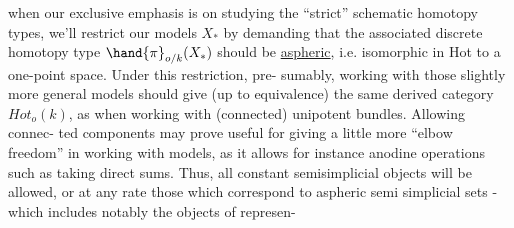 when our exclusive emphasis is on studying the  ``strict'' schematic
homotopy types,  we'll restrict our models $X_{*}$ by demanding that the
associated discrete homotopy type $\hand{\pi}_{o/k}(X_{*})$  should be \uline{aspheric},  i.e.
isomorphic in Hot to a one-point space.  Under this restriction,  pre-%
sumably,  working with those slightly more general models should give
(up to equivalence) the same derived category $Hot_o(k)$,  as when working
with (connected) unipotent bundles.   Allowing connec-%
ted components may prove useful for giving a little more ``elbow freedom''
in working with models,  as it allows for instance anodine operations
such as taking direct sums.  Thus,  all constant semisimplicial objects
will be allowed,  or at any rate those which correspond to aspheric semi
simplicial sets  -  which includes notably the objects of \hand{$\Delta^{\wedge}$} represen-%


